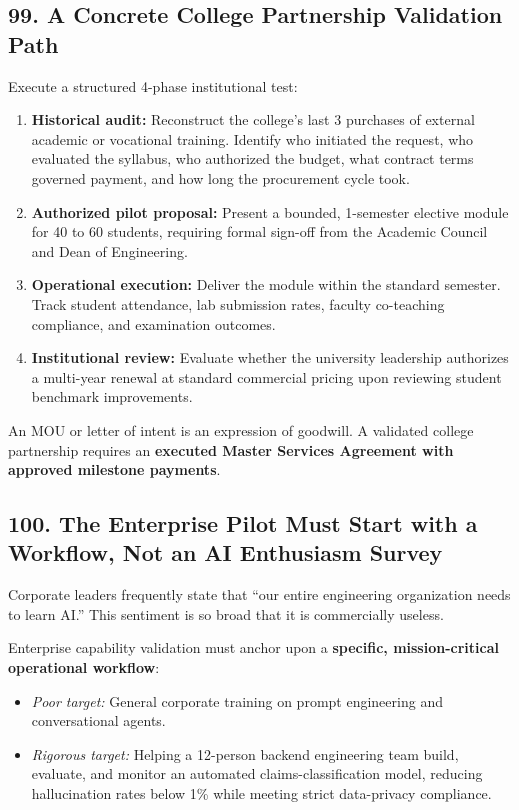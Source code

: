 \subsection*{99. A Concrete College Partnership Validation Path}

Execute a structured 4-phase institutional test:
\begin{enumerate}
    \item \textbf{Historical audit:} Reconstruct the college's last 3 purchases of external academic or vocational training. Identify who initiated the request, who evaluated the syllabus, who authorized the budget, what contract terms governed payment, and how long the procurement cycle took.
    \item \textbf{Authorized pilot proposal:} Present a bounded, 1-semester elective module for 40 to 60 students, requiring formal sign-off from the Academic Council and Dean of Engineering.
    \item \textbf{Operational execution:} Deliver the module within the standard semester. Track student attendance, lab submission rates, faculty co-teaching compliance, and examination outcomes.
    \item \textbf{Institutional review:} Evaluate whether the university leadership authorizes a multi-year renewal at standard commercial pricing upon reviewing student benchmark improvements.
\end{enumerate}

An MOU or letter of intent is an expression of goodwill. A validated college partnership requires an \textbf{executed Master Services Agreement with approved milestone payments}.

\subsection*{100. The Enterprise Pilot Must Start with a Workflow, Not an AI Enthusiasm Survey}

Corporate leaders frequently state that ``our entire engineering organization needs to learn AI.'' This sentiment is so broad that it is commercially useless.

Enterprise capability validation must anchor upon a \textbf{specific, mission-critical operational workflow}:
\begin{itemize}
    \item \emph{Poor target:} General corporate training on prompt engineering and conversational agents.
    \item \emph{Rigorous target:} Helping a 12-person backend engineering team build, evaluate, and monitor an automated claims-classification model, reducing hallucination rates below 1\% while meeting strict data-privacy compliance.
\end{itemize}

